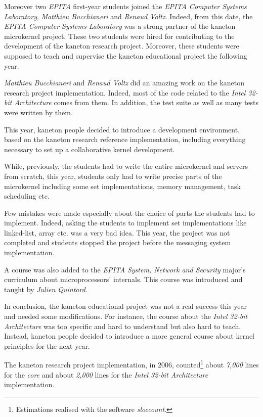 \begin{multicols}{2}
Moreover two \textit{EPITA} first-year students joined the \textit{EPITA
Computer Systems Laboratory}, \textit{Matthieu Bucchianeri} and \textit{Renaud
Voltz}. Indeed, from this date, the \textit{EPITA Computer Systems Laboratory}
was a strong partner of the kaneton microkernel project. These two students
were hired for contributing to the development of the kaneton research project.
Moreover, these students were supposed to teach and supervise the kaneton
educational project the following year.

\textit{Matthieu Bucchianeri} and \textit{Renaud Voltz} did an amazing work
on the kaneton research project implementation. Indeed, most of the
code related to the \textit{Intel 32-bit Architecture} comes from them. In
addition, the test suite as well as many tests were written by them.

This year, kaneton people decided to introduce a development environment,
based on the kaneton research reference implementation, including everything
necessary to set up a collaborative kernel development.

While, previously, the students had to write the entire microkernel and
servers from scratch, this year, students only had to write precise parts
of the microkernel including some set implementations, memory management,
task scheduling etc.

Few mistakes were made especially about the choice of parts the students
had to implement. Indeed, asking the students to implement set implementations
like linked-list, array etc. was a very bad idea. This year, the project
was not completed and students stopped the project before the messaging
system implementation.

A course was also added to the \textit{EPITA} \textit{System, Network
and Security} major's curriculum about microprocessors' internals. This
course was introduced and taught by \textit{Julien Quintard}.

In conclusion, the kaneton educational project was not a real success this year
and needed some modifications. For instance, the course about the \textit{Intel
32-bit Architecture} was too specific and hard to understand but also hard
to teach. Instead, kaneton people decided to introduce a more general course
about kernel principles for the next year.

The kaneton research project implementation, in 2006,
  counted\footnote{Estimations realised with the software \textit{sloccount}.}
about \textit{7,000} lines for the \textit{core} and about \textit{2,000}
lines for the \textit{Intel 32-bit Architecture} implementation.


\end{multicols}
